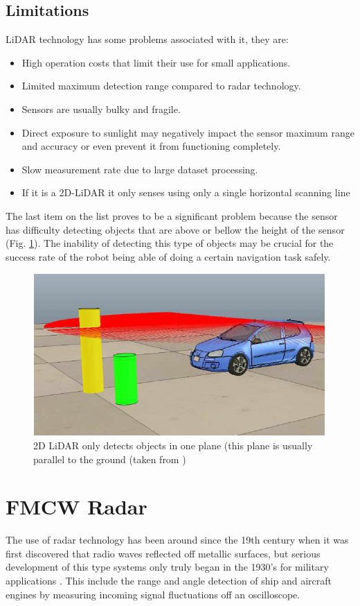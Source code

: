 \subsection{Limitations}
\ac{LiDAR} technology has some problems associated with it, they are:
\begin{itemize}
\item{High operation costs that limit their use for small applications.}  
\item{Limited maximum detection range compared to radar technology.}  
\item{Sensors are usually bulky and fragile.}  
\item{Direct exposure to sunlight may negatively impact the sensor maximum range and accuracy or even prevent it from functioning completely.} 
\item{Slow measurement rate due to large dataset processing.} 
\item {If it is a 2D-\ac{LiDAR} it only senses using only a single horizontal scanning line}
\end{itemize}
The last item on the list proves to be a significant problem because the sensor has difficulty detecting objects that are above or bellow the height of the sensor (Fig. \ref{fig:2dlidar}). The inability of detecting this type of objects may be crucial for the success rate of the robot being able of doing a certain navigation task safely.
\begin{figure}[ht!]
    \centering
    \includegraphics[scale=0.7]{imgs/chapter2/lidar2d.png}
    \caption[2D \ac{LiDAR} only detecting objects in one plane ]{2D \ac{LiDAR} only detects objects in one plane (this plane is usually parallel to the ground (taken from \cite{yalcin2013approaches})}
    \label{fig:2dlidar}
\end{figure}

\section{FMCW Radar}
The use of \ac{radar} technology has been around since the 19th century when it was first discovered that radio waves reflected off metallic surfaces, but serious development of this type systems only truly began in the 1930's for military applications \cite{radar_history}. This include the range and angle detection of ship and aircraft engines by measuring incoming signal fluctuations off an oscilloscope. 

